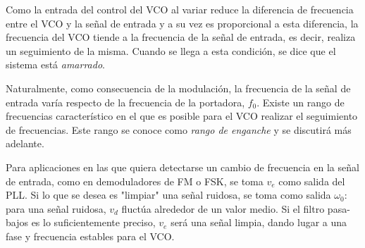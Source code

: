 \documentclass{article}
\begin{document}
Como la entrada del control del VCO al variar reduce la diferencia de frecuencia entre el VCO y la señal de entrada y a su vez es proporcional a esta diferencia, la frecuencia del VCO tiende a la frecuencia de la señal de entrada, es decir, realiza un seguimiento de la misma. Cuando se llega a esta condición, se dice que el sistema está \emph{amarrado}.

Naturalmente, como consecuencia de la modulación, la frecuencia de la señal de entrada varía respecto de la frecuencia de la portadora, $f_{0}$. Existe un rango de frecuencias característico en el que es posible para el VCO realizar el seguimiento de frecuencias. Este rango se conoce como \emph{rango de enganche} y se discutirá más adelante.

Para aplicaciones en las que quiera detectarse un cambio de frecuencia en la señal de entrada, como en demoduladores de FM o FSK, se toma $v_{e}$ como salida del PLL. Si lo que se desea es "limpiar" una señal ruidosa, se toma como salida $\omega_{0}$: para una señal ruidosa, $v_{d}$ fluctúa alrededor de un valor medio. Si el filtro pasa-bajos es lo suficientemente preciso, $v_{e}$ será una señal limpia, dando lugar a una fase y frecuencia estables para el VCO.
\end{document}

